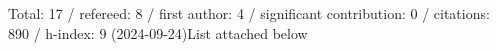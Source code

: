 Total: 17 / refereed: 8 / first author: 4 / significant contribution: 0 / citations: 890 / h-index: 9 (2024-09-24)List attached below